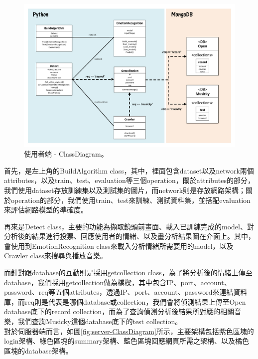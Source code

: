 \documentclass[12pt]{scrreprt}
\begin{document}
\begin{figure}[!h]
\begin{center}
\includegraphics[width=.8\textwidth]{./figs/diagrams/class/client-ClassDiagram.pdf}
\end{center}
\vspace{-1cm}
\caption{使用者端 - ClassDiagram。}
\label{fig:client-ClassDiagram}
\end{figure}

首先，是左上角的BuildAlgorithm class，其中，裡面包含dataset以及network兩個attributes，以及train、test、evaluation等三個operation，關於attributes的部分，我們使用dataset存放訓練集以及測試集的圖片，而network則是存放網路架構；關於operation的部分，我們使用train、test來訓練、測試資料集，並搭配evaluation來評估網路模型的準確度。

再來是Detect class，主要的功能為擷取鏡頭前畫面、載入已訓練完成的model、對分析後的結果進行投票、回應使用者的情緒、以及畫分析結果圖在介面上。其中，會使用到EmotionRecognition class來載入分析情緒所需要用的model，以及Crawler class來搜尋與播放音樂。

而針對跟database的互動則是採用getcollection class，為了將分析後的情緒上傳至database，我們採用getcollection做為橋樑，其中包含IP、port、account、password、req等五個attributes，透過IP、port、account、password來連結資料庫，而req則是代表是哪個database或collection，我們會將偵測結果上傳至Open database底下的record collection，而為了查詢偵測分析後結果所對應的相關音樂，我們查詢Musicky這個database底下的test collection。\\

對於伺服器端而言，如圖\ref{fig:server-ClassDiagram}所示，主要架構包括紫色區塊的login架構、綠色區塊的summary架構、藍色區塊回應網頁所需之架構、以及橘色區塊的database架構。
\end{document}
